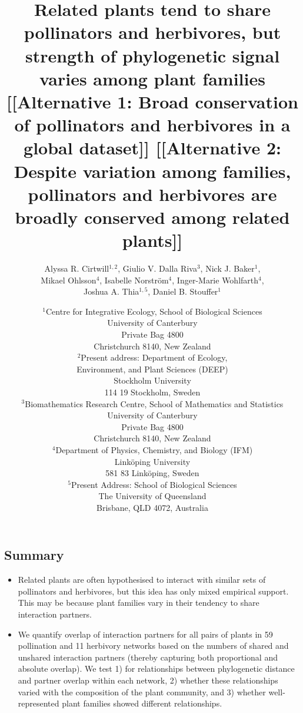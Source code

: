 \documentclass[12pt]{article}
\title{Related plants tend to share pollinators and herbivores, but strength of phylogenetic signal varies among plant families [[Alternative 1: Broad conservation of pollinators and herbivores in a global dataset]]
[[Alternative 2: Despite variation among families, pollinators and herbivores are broadly conserved among related plants]]}
\author{Alyssa R. Cirtwill$^{1,2}$, Giulio V. Dalla Riva$^{3}$, Nick J. Baker$^{1}$,\\
Mikael Ohlsson$^{4}$, Isabelle Norstr\"{o}m$^{4}$, Inger-Marie Wohlfarth$^{4}$,\\ %
Joshua A. Thia$^{1,5}$, %
Daniel B. Stouffer$^{1}$}
\date{\small$^1$Centre for Integrative Ecology, School of Biological Sciences\\University of Canterbury\\Private Bag 4800\\
Christchurch 8140, New Zealand\\
\medskip$^2$Present address: Department of Ecology,\\
Environment, and Plant Sciences (DEEP)\\
Stockholm University\\
114 19 Stockholm, Sweden\\
\medskip$^3$Biomathematics Research Centre, School of Mathematics and Statistics\\
University of Canterbury\\Private Bag 4800\\
Christchurch 8140, New Zealand\\
\medskip$^4$Department of Physics, Chemistry, and Biology (IFM)\\ Link\"{o}ping University\\ 581 83 Link\"{o}ping, Sweden\\
\medskip$^5$Present Address: School of Biological Sciences\\
The University of Queensland\\Brisbane, QLD 4072, Australia }
\begin{document}
\maketitle
\baselineskip=8.5mm
\begin{spacing}{1.0}











\section*{Summary} %

  \begin{itemize}
    \item Related plants are often hypothesised to interact with similar sets of pollinators and herbivores, but this idea has only mixed empirical support. This may be because plant families vary in their tendency to share interaction partners.

    \item We quantify overlap of interaction partners for all pairs of plants in 59 pollination and 11 herbivory networks based on the numbers of shared and unshared interaction partners (thereby capturing both proportional and absolute overlap). We test 1) for relationships between phylogenetic distance and partner overlap within each network, 2) whether these relationships varied with the composition of the plant community, and 3) whether well-represented plant families showed different relationships. 
 

\end{itemize}
\end{spacing}
\end{document}
